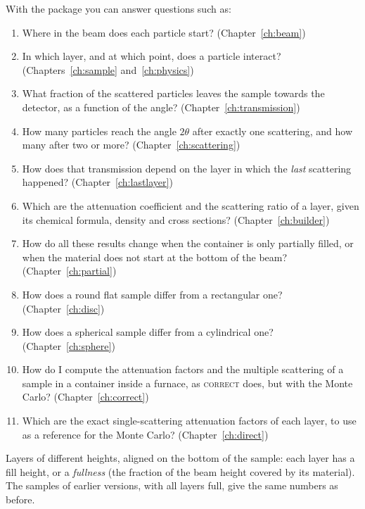With the package you can answer questions such as:
\begin{enumerate}
  \item Where in the beam does each particle start? (Chapter~\ref{ch:beam})
  \item In which layer, and at which point, does a particle interact? (Chapters~\ref{ch:sample} and~\ref{ch:physics})
  \item What fraction of the scattered particles leaves the sample towards the detector,
        as a function of the angle? (Chapter~\ref{ch:transmission})
  \item How many particles reach the angle $2\theta$ after exactly one scattering, and how many
        after two or more? (Chapter~\ref{ch:scattering})
  \item How does that transmission depend on the layer in which the \emph{last} scattering
        happened? (Chapter~\ref{ch:lastlayer})
  \item Which are the attenuation coefficient and the scattering ratio of a layer, given its
        chemical formula, density and cross sections? (Chapter~\ref{ch:builder})
  \item How do all these results change when the container is only partially filled, or when the
        material does not start at the bottom of the beam? (Chapter~\ref{ch:partial})
  \item How does a round flat sample differ from a rectangular one? (Chapter~\ref{ch:disc})
  \item How does a spherical sample differ from a cylindrical one? (Chapter~\ref{ch:sphere})
  \item How do I compute the attenuation factors and the multiple scattering of a sample in a container inside a furnace, as
        \textsc{correct} does, but with the Monte Carlo? (Chapter~\ref{ch:correct})
  \item Which are the exact single-scattering attenuation factors of each layer, to use as a reference
        for the Monte Carlo? (Chapter~\ref{ch:direct})
\end{enumerate}

\begin{note}
Layers of different heights, aligned on the bottom of the sample: each layer has a fill height, or a
\emph{fullness} (the fraction of the beam height covered by its material). The samples of earlier versions,
with all layers full, give the same numbers as before.
\end{note}

